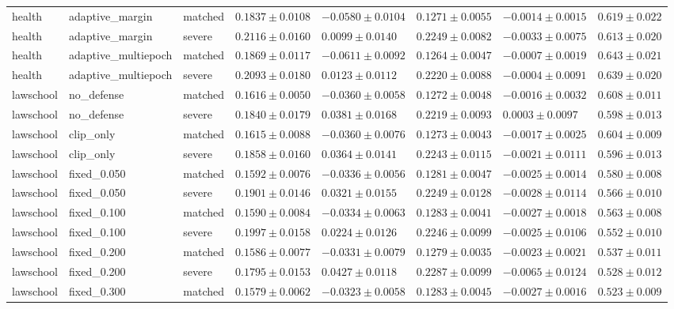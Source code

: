 \begin{table}[!t]
{\begin{tabular}{llllllll}
health & adaptive\_margin & matched & $0.1837\pm0.0108$ & $-0.0580\pm0.0104$ & $0.1271\pm0.0055$ & $-0.0014\pm0.0015$ & $0.619\pm0.022$ \\
health & adaptive\_margin & severe & $0.2116\pm0.0160$ & $0.0099\pm0.0140$ & $0.2249\pm0.0082$ & $-0.0033\pm0.0075$ & $0.613\pm0.020$ \\
health & adaptive\_multiepoch & matched & $0.1869\pm0.0117$ & $-0.0611\pm0.0092$ & $0.1264\pm0.0047$ & $-0.0007\pm0.0019$ & $0.643\pm0.021$ \\
health & adaptive\_multiepoch & severe & $0.2093\pm0.0180$ & $0.0123\pm0.0112$ & $0.2220\pm0.0088$ & $-0.0004\pm0.0091$ & $0.639\pm0.020$ \\
lawschool & no\_defense & matched & $0.1616\pm0.0050$ & $-0.0360\pm0.0058$ & $0.1272\pm0.0048$ & $-0.0016\pm0.0032$ & $0.608\pm0.011$ \\
lawschool & no\_defense & severe & $0.1840\pm0.0179$ & $0.0381\pm0.0168$ & $0.2219\pm0.0093$ & $0.0003\pm0.0097$ & $0.598\pm0.013$ \\
lawschool & clip\_only & matched & $0.1615\pm0.0088$ & $-0.0360\pm0.0076$ & $0.1273\pm0.0043$ & $-0.0017\pm0.0025$ & $0.604\pm0.009$ \\
lawschool & clip\_only & severe & $0.1858\pm0.0160$ & $0.0364\pm0.0141$ & $0.2243\pm0.0115$ & $-0.0021\pm0.0111$ & $0.596\pm0.013$ \\
lawschool & fixed\_0.050 & matched & $0.1592\pm0.0076$ & $-0.0336\pm0.0056$ & $0.1281\pm0.0047$ & $-0.0025\pm0.0014$ & $0.580\pm0.008$ \\
lawschool & fixed\_0.050 & severe & $0.1901\pm0.0146$ & $0.0321\pm0.0155$ & $0.2249\pm0.0128$ & $-0.0028\pm0.0114$ & $0.566\pm0.010$ \\
lawschool & fixed\_0.100 & matched & $0.1590\pm0.0084$ & $-0.0334\pm0.0063$ & $0.1283\pm0.0041$ & $-0.0027\pm0.0018$ & $0.563\pm0.008$ \\
lawschool & fixed\_0.100 & severe & $0.1997\pm0.0158$ & $0.0224\pm0.0126$ & $0.2246\pm0.0099$ & $-0.0025\pm0.0106$ & $0.552\pm0.010$ \\
lawschool & fixed\_0.200 & matched & $0.1586\pm0.0077$ & $-0.0331\pm0.0079$ & $0.1279\pm0.0035$ & $-0.0023\pm0.0021$ & $0.537\pm0.011$ \\
lawschool & fixed\_0.200 & severe & $0.1795\pm0.0153$ & $0.0427\pm0.0118$ & $0.2287\pm0.0099$ & $-0.0065\pm0.0124$ & $0.528\pm0.012$ \\
lawschool & fixed\_0.300 & matched & $0.1579\pm0.0062$ & $-0.0323\pm0.0058$ & $0.1283\pm0.0045$ & $-0.0027\pm0.0016$ & $0.523\pm0.009$ \\

\end{tabular}}
\end{table}
